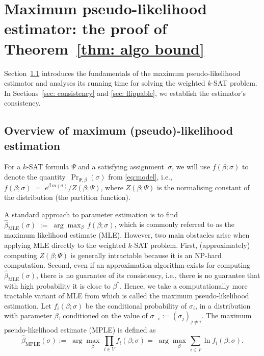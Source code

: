 \documentclass[11pt]{article}
\theoremstyle{definition}
\theoremstyle{remark}
\begin{document}
 

    
\section{Maximum pseudo-likelihood estimator: the proof of Theorem~\ref{thm: algo bound}}
Section~\ref{sec: MPLE} introduces the fundamentals of the maximum pseudo-likelihood estimator and analyses its running time for solving the weighted $k$-SAT problem. 
In Sections~\ref{sec: consistency} and \ref{sec: flippable},
we establish the estimator’s consistency.

\subsection{Overview of maximum (pseudo)-likelihood estimation}
\label{sec: MPLE}
For a $k$-SAT formula $\Psi$ and a satisfying assignment~$\sigma$, we will use $f(\beta;\sigma)$ to denote the quantity~$\Pr_{\Psi,\beta}(\sigma)$ from \eqref{eq:model}, i.e., $f(\beta; \sigma) \;=\; 
e^{\beta \,m(\sigma)}/Z(\beta; \Psi)$, where
 $Z(\beta;\Psi)$ is the normalising constant of the distribution (the partition function). 


 
A standard approach to parameter estimation is to find
$
    \hat{\beta}_{\mathrm{MLE}}(\sigma) 
    \;:=\; \arg\max_{\beta}\, f(\beta; \sigma)$,
which is commonly referred to as the maximum likelihood estimate (MLE). However, two main obstacles arise when applying MLE directly to the weighted \(k\)-SAT problem. First, (approximately)
computing \(Z(\beta; \Psi)\) is generally intractable because it is an NP-hard computation. Second, even if an approximation algorithm exists for computing \(\hat{\beta}_{\mathrm{MLE}}(\sigma)\), there is no guarantee of its consistency, i.e., there is no guarantee that with high probability it is close to $\beta^*$.
Hence, we take a  computationally more tractable variant of MLE from \cite{Besag74}  which is called the maximum pseudo-likelihood estimation. 
Let $f_i(\beta; \sigma)$ be the conditional probability of $\sigma_i$,  in a distribution with parameter \(\beta\), conditioned on the value of $\sigma_{-i}:=(\sigma_j)_{j\neq i}$. 
The maximum pseudo-likelihood estimate (MPLE) is defined as
\[
    \hat{\beta}_{\mathrm{MPLE}}(\sigma) :=\; \arg\max_{\beta}\, \prod_{i\in V} f_i(\beta; \sigma)
    =\; \arg\max_{\beta}\, \sum_{i\in V} \ln f_i(\beta; \sigma).
\]
\end{document}
